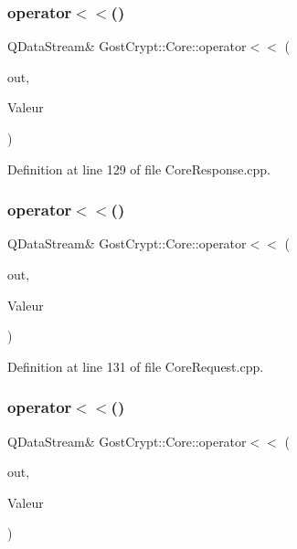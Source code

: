 \subsubsection{\texorpdfstring{operator$<$$<$()}{operator<<()}\hspace{0.1cm}{\footnotesize\ttfamily [21/56]}}
{\footnotesize\ttfamily Q\+Data\+Stream\& Gost\+Crypt\+::\+Core\+::operator$<$$<$ (\begin{DoxyParamCaption}\item[{Q\+Data\+Stream \&}]{out,  }\item[{const \hyperlink{struct_gost_crypt_1_1_core_1_1_get_host_devices_response}{Get\+Host\+Devices\+Response} \&}]{Valeur }\end{DoxyParamCaption})}



Definition at line 129 of file Core\+Response.\+cpp.

\mbox{\label{namespace_gost_crypt_1_1_core_a8e7f64d391e2b1e639fe7273cc08334c}} 
\subsubsection{\texorpdfstring{operator$<$$<$()}{operator<<()}\hspace{0.1cm}{\footnotesize\ttfamily [22/56]}}
{\footnotesize\ttfamily Q\+Data\+Stream\& Gost\+Crypt\+::\+Core\+::operator$<$$<$ (\begin{DoxyParamCaption}\item[{Q\+Data\+Stream \&}]{out,  }\item[{const \hyperlink{struct_gost_crypt_1_1_core_1_1_mount_volume_request}{Mount\+Volume\+Request} \&}]{Valeur }\end{DoxyParamCaption})}



Definition at line 131 of file Core\+Request.\+cpp.

\mbox{\label{namespace_gost_crypt_1_1_core_a63176f3ce0a790cecf5c42b42cdfbda3}} 
\subsubsection{\texorpdfstring{operator$<$$<$()}{operator<<()}\hspace{0.1cm}{\footnotesize\ttfamily [23/56]}}
{\footnotesize\ttfamily Q\+Data\+Stream\& Gost\+Crypt\+::\+Core\+::operator$<$$<$ (\begin{DoxyParamCaption}\item[{Q\+Data\+Stream \&}]{out,  }\item[{const \hyperlink{class_gost_crypt_1_1_core_1_1_fail_mount_filesystem}{Gost\+Crypt\+::\+Core\+::\+Fail\+Mount\+Filesystem} \&}]{Valeur }\end{DoxyParamCaption})}



